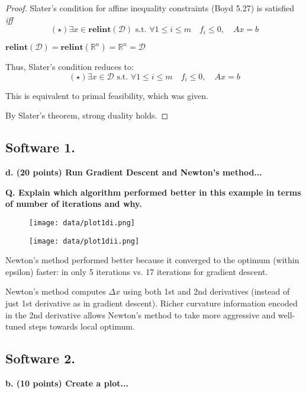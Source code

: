 \documentclass[a4paper,10pt]{article}
\theoremstyle{definition}
\begin{document}
\begin{proof}
Slater's condition for affine inequality constraints (Boyd 5.27) is satisfied \textit{iff}
\[
    (\star) \exists x\in \textbf{relint}(\mathcal{D}) \text{ s.t. } \forall 1\leq i\leq m 
    \quad f_i \leq 0, \quad Ax = b
\]


$\textbf{relint}(\mathcal{D}) = \textbf{relint}(\mathbb{R}^n) = \mathbb{R}^n = \mathcal{D}$


Thus, Slater's condition reduces to:
\[
    (\star) \exists x\in \mathcal{D} \text{ s.t. } \forall 1\leq i\leq m 
    \quad f_i \leq 0, \quad Ax = b
\]

This is equivalent to primal feasibility, which was given.

By Slater's theorem, strong duality holds.
\end{proof}



\subsection*{Software 1. }

\textbf{d. (20 points) Run Gradient Descent and Newton's method...}

\textbf{Q. Explain which algorithm performed better in this example in terms of number of iterations and why.}
\begin{figure}[h]
  \centering
  \texttt{[image: data/plot1di.png]}
  \label{fig:plot1di}
\end{figure}

\begin{figure}[h]
  \centering
  \texttt{[image: data/plot1dii.png]}
  \label{fig:plot1dii}
\end{figure}

Newton's method performed better because it converged to the
optimum (within epsilon) faster: in only 5 iterations vs.
17 iterations for gradient descent.

Newton's method computes $\Delta x$ using both 1st and 2nd derivatives 
(instead of just 1st derivative as in gradient descent).
Richer curvature information encoded in the 2nd derivative allows Newton's 
method to take more aggressive and well-tuned steps towards local optimum.

\subsection*{Software 2.}

\textbf{b. (10 points) Create a plot...}
\end{document}
